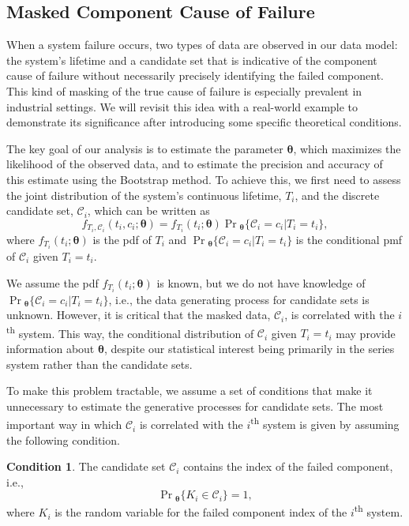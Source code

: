 \documentclass[
]{article}
\theoremstyle{definition}
\newtheorem{condition}{Condition}
\theoremstyle{plain}
\theoremstyle{definition}
\theoremstyle{definition}
\theoremstyle{definition}
\theoremstyle{definition}
\theoremstyle{remark}
\begin{document}
\hypertarget{candmod}{%
\subsection{Masked Component Cause of Failure}\label{candmod}}

When a system failure occurs, two types of data are observed in our data model:
the system's lifetime and a candidate set that is indicative of
the component cause of failure without necessarily precisely identifying the
failed component. This kind of masking of the true cause of failure is
especially prevalent in industrial settings. We will revisit this idea with a
real-world example to demonstrate its significance after introducing some
specific theoretical conditions.

The key goal of our analysis is to estimate the parameter \(\boldsymbol{\theta}\), which
maximizes the likelihood of the observed data, and to estimate the precision and
accuracy of this estimate using the Bootstrap method. To achieve this, we first
need to assess the joint distribution of the system's continuous lifetime,
\(T_i\), and the discrete candidate set, \(\mathcal{C}_i\), which can be written as
\[
f_{T_i,\mathcal{C}_i}(t_i,c_i;\boldsymbol{\theta}) = f_{T_i}(t_i;\boldsymbol{\theta})
    \Pr{}_{\!\boldsymbol{\theta}}\{\mathcal{C}_i = c_i | T_i = t_i\},
\]
where \(f_{T_i}(t_i;\boldsymbol{\theta})\) is the pdf of \(T_i\) and
\(\Pr{}_{\!\boldsymbol{\theta}}\{\mathcal{C}_i = c_i | T_i = t_i\}\) is the conditional
pmf of \(\mathcal{C}_i\) given \(T_i = t_i\).

We assume the pdf \(f_{T_i}(t_i;\boldsymbol{\theta})\) is known, but we do not have knowledge
of \(\Pr{}_{\!\boldsymbol{\theta}}\{\mathcal{C}_i = c_i | T_i = t_i\}\), i.e., the data generating
process for candidate sets is unknown. However, it is critical that the masked
data, \(\mathcal{C}_i\), is correlated with the \(i\)\textsuperscript{th} system.
This way, the conditional distribution of \(\mathcal{C}_i\) given \(T_i = t_i\) may
provide information about \(\boldsymbol{\theta}\), despite our statistical interest being
primarily in the series system rather than the candidate sets.

To make this problem tractable, we assume a set of conditions that make it
unnecessary to estimate the generative processes for candidate sets.
The most important way in which \(\mathcal{C}_i\) is correlated with the
\(i\)\textsuperscript{th} system is given by assuming the following condition.

\begin{condition}
\label{cond:c-contains-k}
The candidate set $\mathcal{C}_i$ contains the index of the failed component, i.e.,
$$
\Pr{}_{\!\boldsymbol{\theta}}\{K_i \in \mathcal{C}_i\} = 1,
$$
where $K_i$ is the random variable for the failed component index of the
$i$\textsuperscript{th} system.
\end{condition}
\end{document}
